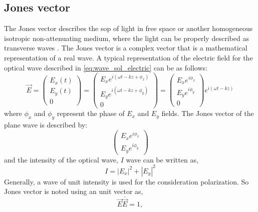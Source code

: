 \documentclass[../report.tex]{subfiles}
\begin{document}
			\subsection{Jones vector}
The Jones vector describes the \gls{sop} of light in free space or another homogeneous isotropic non-attenuating medium, where the light can be properly described as transverse waves \cite{burch_introduction_1975}. The Jones vector is a complex vector that is a mathematical representation of a real wave. A typical representation of the electric field for the optical wave described in \ref{eq:wave_sol_electric} can be as follows:
\begin{equation}\label{eq:jones_vector}
\vec{E} = \left( \begin{matrix} E_{x}\left( t\right) \\ E_{y}\left( t\right) \\ 0\end{matrix} \right) = \left( \begin{matrix} E_{x}e^{i\left( \omega t - kz+\phi _{x}\right)} \\ E_{y}e^{i\left( \omega t - kz+\phi _{y}\right) }\\ 0\end{matrix} \right) = \left( \begin{matrix} E_{x}e^{i\phi_x}\\ E_{y}e^{i\phi_y}\\ 0 \end{matrix} \right)e^{i\left( \omega t - kz\right)} 
\end{equation}
where $\phi_x$ and $\phi_y$ represent the phase of $E_x$ and $E_y$ fields. The Jones vector of the plane wave is described by:
\begin{equation}\label{eq:jones_vector_form}
\left( \begin{matrix} E_{x}e^{i\phi_x}\\ E_{y}e^{i\phi_y}\end{matrix} \right) 
\end{equation}
and the intensity of the optical wave, $I$ wave can be written as,
\begin{equation}\label{eq:jones_vector_intensity}
I = \left| E_x\right| ^{2}+\left| E_y\right| ^{2} 
\end{equation}
Generally, a wave of unit intensity is used for the consideration polarization. So Jones vector is noted using an unit vector as,
\begin{equation}\label{eq:jones_unit_vector_form}
	\vec{E}\overline {\vec{E}} = 1,
\end{equation}
\end{document}
